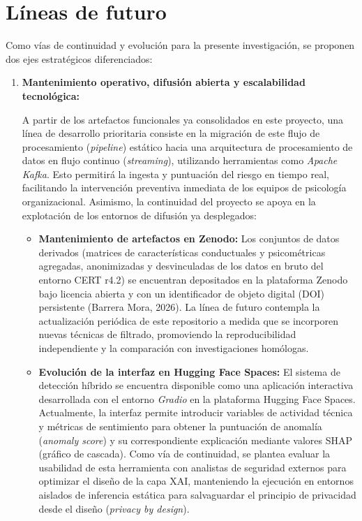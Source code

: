 \documentclass[IB]{TFUOC}%
\begin{document}
\section{Líneas de futuro}
Como vías de continuidad y evolución para la presente investigación, se proponen dos ejes estratégicos diferenciados:

\begin{enumerate}
    \item \textbf{Mantenimiento operativo, difusión abierta y escalabilidad tecnológica:}
    
    A partir de los artefactos funcionales ya consolidados en este proyecto, una línea de desarrollo prioritaria consiste en la migración de este flujo de procesamiento (\textit{pipeline}) estático hacia una arquitectura de procesamiento de datos en flujo continuo (\textit{streaming}), utilizando herramientas como \textit{Apache Kafka}. Esto permitirá la ingesta y puntuación del riesgo en tiempo real, facilitando la intervención preventiva inmediata de los equipos de psicología organizacional. Asimismo, la continuidad del proyecto se apoya en la explotación de los entornos de difusión ya desplegados:

\begin{itemize}
    \item \textbf{Mantenimiento de artefactos en Zenodo:} Los conjuntos de datos derivados (matrices de características conductuales y psicométricas agregadas, anonimizadas y desvinculadas de los datos en bruto del entorno CERT r4.2) se encuentran depositados en la plataforma Zenodo bajo licencia abierta y con un identificador de objeto digital (DOI) persistente (Barrera Mora, 2026). La línea de futuro contempla la actualización periódica de este repositorio a medida que se incorporen nuevas técnicas de filtrado, promoviendo la reproducibilidad independiente y la comparación con investigaciones homólogas.
    
    \item \textbf{Evolución de la interfaz en Hugging Face Spaces:} El sistema de detección híbrido se encuentra disponible como una aplicación interactiva desarrollada con el entorno \textit{Gradio} en la plataforma Hugging Face Spaces. Actualmente, la interfaz permite introducir variables de actividad técnica y métricas de sentimiento para obtener la puntuación de anomalía (\textit{anomaly score}) y su correspondiente explicación mediante valores SHAP (gráfico de cascada). Como vía de continuidad, se plantea evaluar la usabilidad de esta herramienta con analistas de seguridad externos para optimizar el diseño de la capa XAI, manteniendo la ejecución en entornos aislados de inferencia estática para salvaguardar el principio de privacidad desde el diseño (\textit{privacy by design}).
\end{itemize}


\end{enumerate}
\end{document}
